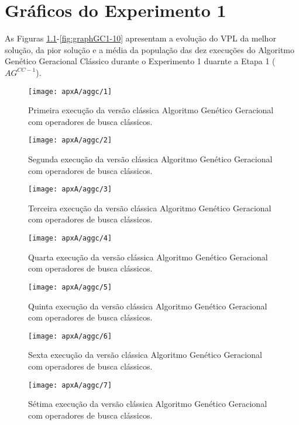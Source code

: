 \chapter{Gráficos do Experimento 1}

As Figuras \ref{fig:graphGC1-01}-\ref{fig:graphGC1-10} apresentam a evolução do VPL da melhor solução, da pior solução e a média da população das dez execuções do Algoritmo Genético Geracional Clássico durante o Experimento 1 duarnte a Etapa 1 ($AG^{CC-1}$).

\begin{figure}[H]
\centering
\texttt{[image: apxA/aggc/1]}
\caption{Primeira execução da versão clássica Algoritmo Genético Geracional com operadores de busca clássicos.}
\label{fig:graphGC1-01}
\end{figure}

\begin{figure}[H]
\centering
\texttt{[image: apxA/aggc/2]}
\caption{Segunda execução da versão clássica Algoritmo Genético Geracional com operadores de busca clássicos.}
\label{fig:graphGC1-03}
\end{figure}

\begin{figure}[H]
\centering
\texttt{[image: apxA/aggc/3]}
\caption{Terceira execução da versão clássica Algoritmo Genético Geracional com operadores de busca clássicos.}
\label{fig:graphGC1-03}
\end{figure}

\begin{figure}[H]
\centering
\texttt{[image: apxA/aggc/4]}
\caption{Quarta execução da versão clássica Algoritmo Genético Geracional com operadores de busca clássicos.}
\label{fig:graphGC1-04}
\end{figure}

\begin{figure}[htb]
\centering
\texttt{[image: apxA/aggc/5]}
\caption{Quinta execução da versão clássica Algoritmo Genético Geracional com operadores de busca clássicos.}
\label{fig:graphGC1-05}
\end{figure}


\begin{figure}[H]
\centering
\texttt{[image: apxA/aggc/6]}
\caption{Sexta execução da versão clássica Algoritmo Genético Geracional com operadores de busca clássicos.}
\label{fig:graphGC1-06}
\end{figure}

\begin{figure}[H]
\centering
\texttt{[image: apxA/aggc/7]}
\caption{Sétima execução da versão clássica Algoritmo Genético Geracional com operadores de busca clássicos.}
\label{fig:graphGC1-07}
\end{figure}

